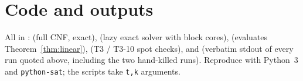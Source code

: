 \documentclass[11pt]{article}
\theoremstyle{definition}
\theoremstyle{remark}
\begin{document}
\section{Code and outputs}
All in :
 (full CNF, exact),
 (lazy exact solver with block cores),
 (evaluates Theorem~\ref{thm:linear}),
 (T3 / T3-10 spot checks), and
 (verbatim stdout of every run quoted above, including
the two hand-killed runs). Reproduce with Python~3 and \texttt{python-sat}; the scripts take
\texttt{t,k} arguments.
\end{document}
